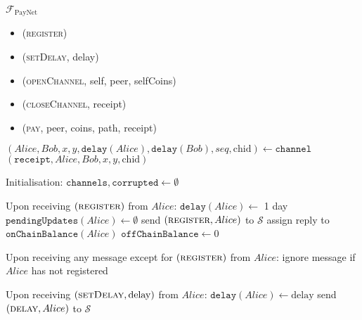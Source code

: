 \begin{functionality}{$\mathcal{F}_{\mathrm{PayNet}}$}
  \label{alg:payfunc}
    \begin{itemize}
      \item (\textsc{register})
      \item (\textsc{setDelay}, delay)
      \item (\textsc{openChannel}, self, peer, selfCoins)
      \item (\textsc{closeChannel}, receipt)
      \item (\textsc{pay}, peer, coins, path, receipt)
    \end{itemize}

  \begin{algorithmic}[1]
      \State $\left(Alice, Bob, x, y, \mathtt{delay}\left(Alice\right),
      \mathtt{delay}\left(Bob\right), seq, \mathrm{chid}\right) \gets
      \mathtt{channel}$
      \State \Return $\left(\mathtt{receipt}, Alice, Bob, x, y,
      \mathrm{chid}\right)$
    \EndFunction
    \State

    \State Initialisation:
    \Indent
      \State $\mathtt{channels}, \mathtt{corrupted} \gets \emptyset$
    \EndIndent
    \State

    \State Upon receiving $\left(\textsc{register}\right)$ from $Alice$:
    \Indent
      \State $\mathtt{delay}\left(Alice\right) \gets$ 1 day 
      \State $\mathtt{pendingUpdates}\left(Alice\right) \gets \emptyset$
      \State send $\left(\textsc{register}, Alice\right)$ to $\mathcal{S}$
      \State assign reply to $\mathtt{onChainBalance}\left(Alice\right)$
      \State $\mathtt{offChainBalance} \gets 0$
    \EndIndent
    \State

    \State Upon receiving any message except for
    $\left(\textsc{register}\right)$ from $Alice$:
    \Indent
      \State ignore message if $Alice$ has not registered
    \EndIndent
    \State

    \State Upon receiving $\left(\textsc{setDelay}, \mathrm{delay}\right)$ from
    $Alice$:
    \Indent
      \State $\mathtt{delay}\left(Alice\right) \gets \mathrm{delay}$
      \State send $\left(\textsc{delay}, Alice\right)$ to $\mathcal{S}$
    \EndIndent
    \State


\end{algorithmic}
\end{functionality}
